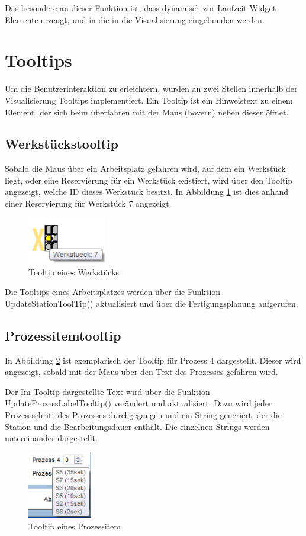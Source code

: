 Das besondere an dieser Funktion ist, dass dynamisch zur Laufzeit Widget-Elemente erzeugt, und in die in die Visualisierung eingebunden werden. 

\section{Tooltips}
\label{sec:tooltips}

Um die Benutzerinteraktion zu erleichtern, wurden an zwei Stellen innerhalb der Visualisierung Tooltips implementiert. Ein Tooltip ist ein Hinweistext zu einem Element, der sich beim überfahren mit der Maus (hovern) neben dieser öffnet. 

\subsection{Werkstückstooltip}

Sobald die Maus über ein Arbeitsplatz gefahren wird, auf dem ein Werkstück liegt, oder eine Reservierung für ein Werkstück existiert, wird über den Tooltip angezeigt, welche ID dieses Werkstück besitzt. In Abbildung \ref{fig:Stationstooltip} ist dies anhand einer Reservierung für Werkstück 7 angezeigt. 

\begin{figure}[htb]
    \centering
    \includegraphics[width=0.31\textwidth]{Abbildungen/Werkstueckhover.png}
    \caption{Tooltip eines Werkstücks}		
    \label{fig:Stationstooltip}
\end{figure}

Die Tooltips eines Arbeitsplatzes werden über die Funktion UpdateStationToolTip() aktualisiert und über die Fertigungsplanung aufgerufen. 

\subsection{Prozessitemtooltip}

In Abbildung \ref{fig:Prozessitemtooltip} ist exemplarisch der Tooltip für Prozess 4 dargestellt. Dieser wird angezeigt, sobald mit der Maus über den Text des Prozesses gefahren wird. 

Der Im Tooltip dargestellte Text wird über die Funktion UpdateProzessLabelTooltip() verändert und aktualisiert. Dazu wird jeder Prozessschritt des Prozesses durchgegangen und ein String generiert, der die Station und die Bearbeitungsdauer enthält. Die einzelnen Strings werden untereinander dargestellt. 

\begin{figure}[htb]
    \centering
    \includegraphics[width=0.25\textwidth]{Abbildungen/Prozesshover.png}
    \caption{Tooltip eines Prozessitem}		
    \label{fig:Prozessitemtooltip}
\end{figure}
